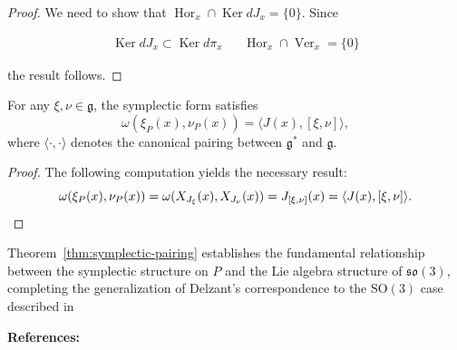 \begin{proof}
We need to show that $\operatorname{Hor}_{x} \cap \operatorname{Ker} dJ_{x} = \{0\}$. Since 

\begin{align}
\operatorname{Ker} dJ_{x} \subset \operatorname{Ker} d\pi_{x} && \operatorname{Hor}_{x} \cap \operatorname{Ver}_{x} = \{0\}
\end{align}

\noindent the result follows.
\end{proof}

\begin{theorem}\label{thm:symplectic-pairing}
For any $\xi, \nu \in \mathfrak{g}$, the symplectic form satisfies
\begin{equation}
\omega(\xi_{P}(x), \nu_{P}(x)) = \langle J(x), [\xi, \nu] \rangle,
\end{equation}
where $\langle \cdot, \cdot \rangle$ denotes the canonical pairing between $\mathfrak{g}^*$ and $\mathfrak{g}$.
\end{theorem}

\begin{proof}
The following computation yields the necessary result:
\begin{equation}
\omega(\xi_{P}(x), \nu_{P}(x)) = \omega(X_{J_{\xi}}(x), X_{J_{\nu}}(x)) = J_{[\xi, \nu]}(x) = \langle J(x), [\xi, \nu] \rangle. \qedhere
\end{equation}
\end{proof}

\begin{remark}
Theorem~\ref{thm:symplectic-pairing} establishes the fundamental relationship between the symplectic structure on $P$ and the Lie algebra structure of $\mathfrak{so}(3)$, completing the generalization of Delzant's correspondence to the $\mathrm{SO}(3)$ case described in \textcite{Blaom1996}
\end{remark} \bigskip

\noindent \textbf{References:} \textcite{Blaom1996}

\newpage 
\setcounter{section}{7}